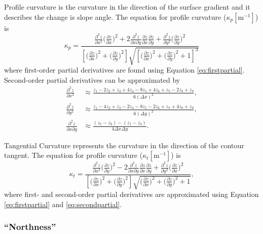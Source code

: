 \documentclass[12pt]{article}
\begin{document}
Profile curvature is the curvature in the direction of the surface gradient and it describes the change is slope angle. The equation for profile curvature ($\kappa_p \left[\mathrm{m}^{-1}\right]$) is \citep{Neteler2008}
\begin{equation} 
\kappa_p = \frac{\frac{\partial^2 z}{\partial x^2} \big(\frac{\partial z}{\partial x}\big)^2 + 2\frac{\partial^2 z}{\partial x \partial y}\frac{\partial z}{\partial x}\frac{\partial z}{\partial y} +  \frac{\partial^2 z}{\partial y^2} \big(\frac{\partial z}{\partial y}\big)^2}{\left[\big( \frac{\partial z}{\partial x} \big) ^2 + \big(\frac{\partial z}{\partial y} \big)^2\right] \sqrt{\left[\big(\frac{\partial z}{\partial x} \big) ^2 + \big( \frac{\partial z}{\partial y}\big) ^2+1\right]^3}}
\end{equation} 
where first-order partial derivatives are found using Equation \ref{eq:firstpartial}. Second-order partial derivatives can be approximated by \citep{Hofierka2009, Neteler2008}
\begin{align}\label{eq:secondpartial}
\frac{\partial^2 z}{\partial x^2} &\approx\frac{z_1-2z_2+z_3+4z_4-8z_5+4z_6+z_7-2z_8+z_9}{6  (\Delta x)^2},\nonumber\\
\frac{\partial^2 z}{\partial y^2} &\approx \frac{z_1-4z_2+z_3-2z_4-8z_5-2z_6+z_7+4z_8+z_9}{6  (\Delta y)^2},\nonumber\\
\frac{\partial^2 z}{\partial x \partial y} &\approx \frac{(z_7-z_9)-(z_1-z_3)}{4  \Delta x \Delta y}.
\end{align}

Tangential Curvature represents the curvature in the direction of the contour tangent. The equation for profile curvature ($\kappa_t \left[\mathrm{m}^{-1}\right]$) is \citep{Neteler2008}
\begin{equation}
\kappa_t = \frac{\frac{\partial^2 z}{\partial x^2} \big(\frac{\partial z}{\partial y}\big)^2 - 2\frac{\partial^2 z}{\partial x \partial y}\frac{\partial z}{\partial x}\frac{\partial z}{\partial y} +  \frac{\partial^2 z}{\partial y^2} \big(\frac{\partial z}{\partial x}\big)^2}{\left[\big( \frac{\partial z}{\partial x} \big) ^2 + \big(\frac{\partial z}{\partial y} \big)^2\right] \sqrt{\big(\frac{\partial z}{\partial x} \big) ^2 + \big( \frac{\partial z}{\partial y}\big) ^2 +1}},
\end{equation} 	
where first- and second-order partial derivatives are approximated using Equation \ref{eq:firstpartial} and \ref{eq:secondpartial}. 

\subsubsection*{``Northness''} 
\end{document}
